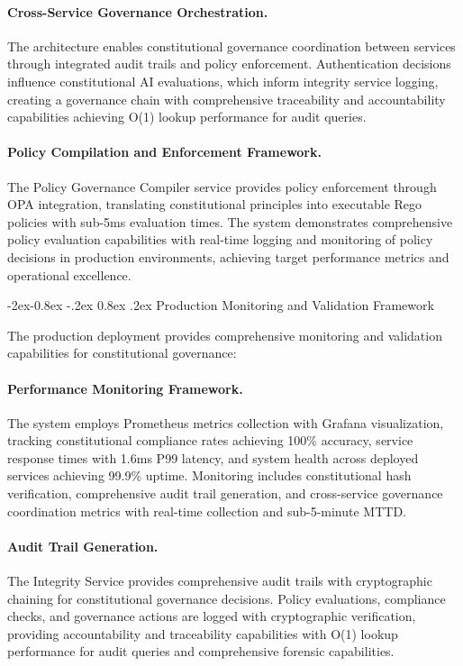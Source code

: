 \documentclass[manuscript,screen,9pt]{acmart}
\makeatletter
\renewcommand\subsubsection{\@startsection{subsubsection}{3}{\z@}%
  {-2ex\@plus -0.8ex \@minus -.2ex}%
  {0.8ex \@plus .2ex}%
  {\normalfont\normalsize\bfseries}}
\makeatother
\begin{document}
\begin{table}[!htb]
\paragraph{Cross-Service Governance Orchestration.} The architecture enables constitutional governance coordination between services through integrated audit trails and policy enforcement. Authentication decisions influence constitutional AI evaluations, which inform integrity service logging, creating a governance chain with comprehensive traceability and accountability capabilities achieving O(1) lookup performance for audit queries.

\paragraph{Policy Compilation and Enforcement Framework.} The Policy Governance Compiler service provides policy enforcement through OPA integration, translating constitutional principles into executable Rego policies with sub-5ms evaluation times. The system demonstrates comprehensive policy evaluation capabilities with real-time logging and monitoring of policy decisions in production environments, achieving target performance metrics and operational excellence.

\subsubsection{Production Monitoring and Validation Framework}
\label{subsubsec:production_monitoring}

The production deployment provides comprehensive monitoring and validation capabilities for constitutional governance:

\paragraph{Performance Monitoring Framework.} The system employs Prometheus metrics collection with Grafana visualization, tracking constitutional compliance rates achieving 100\% accuracy, service response times with 1.6ms P99 latency, and system health across deployed services achieving 99.9\% uptime. Monitoring includes constitutional hash verification, comprehensive audit trail generation, and cross-service governance coordination metrics with real-time collection and sub-5-minute MTTD.

\paragraph{Audit Trail Generation.} The Integrity Service provides comprehensive audit trails with cryptographic chaining for constitutional governance decisions. Policy evaluations, compliance checks, and governance actions are logged with cryptographic verification, providing accountability and traceability capabilities with O(1) lookup performance for audit queries and comprehensive forensic capabilities.


\end{table}
\end{document}
